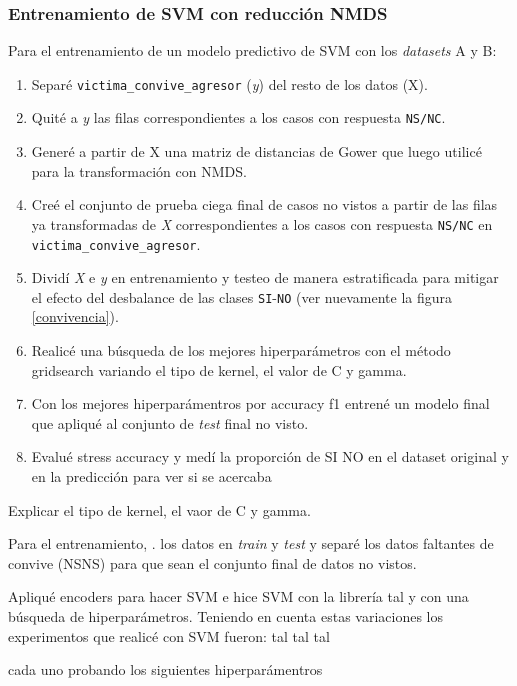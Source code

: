 \documentclass[10 pt]{article}
\begin{document}
\subsubsection{Entrenamiento de SVM con reducción NMDS}

Para el entrenamiento de un modelo predictivo de SVM con los \textit{datasets} A y B: 
\begin{enumerate}
    \item Separé \texttt{victima\_convive\_agresor} (\textit{y}) del resto de los datos (X).
    \item Quité a \textit{y} las filas correspondientes a los casos con respuesta \texttt{NS/NC}. 
    \item Generé a partir de X una matriz de distancias de Gower que luego utilicé para la transformación con NMDS.
    \item Creé el conjunto de prueba ciega final de casos no vistos a partir de las filas ya transformadas de \textit{X} correspondientes a los casos con respuesta \texttt{NS/NC} en \texttt{victima\_convive\_agresor}.
    \item Dividí \textit{X} e \textit{y} en entrenamiento y testeo de manera estratificada para mitigar el efecto del desbalance de las clases \texttt{SI}-\texttt{NO} (ver nuevamente la figura \ref{convivencia}).
    \item Realicé una búsqueda de los mejores hiperparámetros con el método gridsearch variando el tipo de kernel, el valor de C y gamma. 
    \item Con los mejores hiperparámentros por accuracy f1 entrené un modelo final que apliqué al conjunto de \textit{test} final no visto.
    \item Evalué stress accuracy y medí la proporción de SI NO en el dataset original y en la predicción para ver si se acercaba
\end{enumerate}


Explicar el tipo de kernel, el vaor de C y gamma.

Para el entrenamiento, . los datos en \textit{train} y \textit{test} y separé los datos faltantes de convive (NSNS) para que sean el conjunto final de datos no vistos.



Apliqué encoders para hacer SVM e hice SVM con la librería tal y con una búsqueda de hiperparámetros.  Teniendo en cuenta estas variaciones los experimentos que realicé con SVM fueron: 
tal tal tal

cada uno probando los siguientes hiperparámentros
\end{document}
